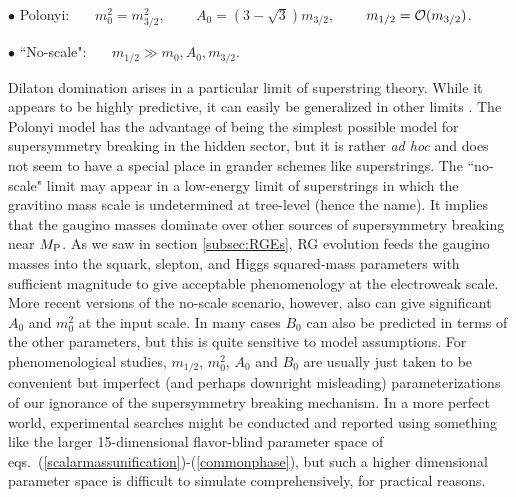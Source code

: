 \documentclass[12pt]{article}
\def\MPlanck{M_{\rm P}}
\begin{document}
$\bullet$
Polonyi: \cite{polonyi}
{}~~~$m^2_0 = m^2_{3/2}$,
{}~~~~$A_0 = (3 -{\sqrt 3}) m_{3/2}$,
{}~~~~$m_{1/2} = {\cal O}(m_{3/2})$.

\vspace{.08in}

$\bullet$ ``No-scale": \cite{noscale}~~~$m_{1/2} \gg
m_0, A_0, m_{3/2}$.

\vspace{.1in}

\noindent Dilaton domination arises in a particular limit of 
superstring theory. While it appears to be highly predictive, it can 
easily be generalized in other limits \cite{stringsoft}. The Polonyi model 
has the advantage of being the simplest possible model for supersymmetry 
breaking in the hidden sector, but it is rather {\it ad hoc} and does not 
seem to have a special place in grander schemes like superstrings. The 
``no-scale" limit may appear in a low-energy limit of superstrings in which 
the gravitino mass scale is undetermined at tree-level (hence the name). 
It implies that the gaugino masses dominate over other sources of 
supersymmetry breaking near $\MPlanck$. As we saw in section 
\ref{subsec:RGEs}, RG evolution feeds the gaugino masses into the squark, slepton, 
and Higgs squared-mass parameters with sufficient magnitude to give 
acceptable phenomenology at the electroweak scale. More recent versions of 
the no-scale scenario, however, also can give significant $A_0$ and 
$m_0^2$ at the input scale. In many cases $B_0$ can also be predicted in terms 
of the other parameters, but this is quite sensitive to model assumptions. 
For phenomenological studies, $m_{1/2}$, $m_0^2$, $A_0$ and $B_0$ are 
usually just taken to be convenient but imperfect (and perhaps 
downright misleading) parameterizations 
of our ignorance of the supersymmetry breaking mechanism.
In a more perfect world, experimental searches might be conducted and reported
using something like the larger 15-dimensional flavor-blind parameter 
space of eqs.~(\ref{scalarmassunification})-(\ref{commonphase}), 
but such a higher dimensional parameter space is difficult 
to simulate comprehensively,
for practical reasons.
\end{document}
